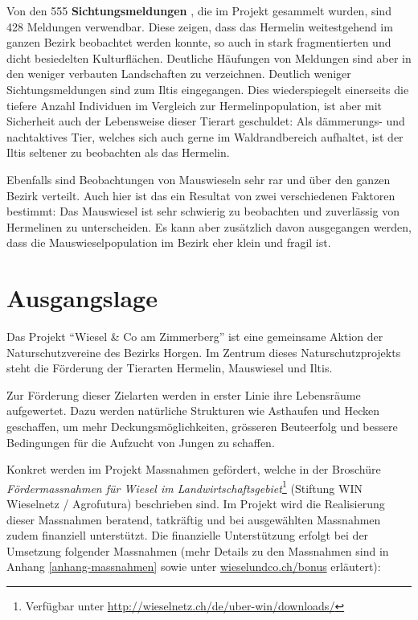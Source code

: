 \documentclass[
  oneside]{scrbook}
\begin{document}
Von den 555 \textbf{Sichtungsmeldungen} , die im Projekt gesammelt wurden, sind 428 Meldungen verwendbar. Diese zeigen, dass das Hermelin weitestgehend im ganzen Bezirk beobachtet werden konnte, so auch in stark fragmentierten und dicht besiedelten Kulturflächen. Deutliche Häufungen von Meldungen sind aber in den weniger verbauten Landschaften zu verzeichnen. Deutlich weniger Sichtungsmeldungen sind zum Iltis eingegangen. Dies wiederspiegelt einerseits die tiefere Anzahl Individuen im Vergleich zur Hermelinpopulation, ist aber mit Sicherheit auch der Lebensweise dieser Tierart geschuldet: Als dämmerungs- und nachtaktives Tier, welches sich auch gerne im Waldrandbereich aufhaltet, ist der Iltis seltener zu beobachten als das Hermelin.

Ebenfalls sind Beobachtungen von Mauswieseln sehr rar und über den ganzen Bezirk verteilt. Auch hier ist das ein Resultat von zwei verschiedenen Faktoren bestimmt: Das Mauswiesel ist sehr schwierig zu beobachten und zuverlässig von Hermelinen zu unterscheiden. Es kann aber zusätzlich davon ausgegangen werden, dass die Mauswieselpopulation im Bezirk eher klein und fragil ist.

\hypertarget{ausgangslage}{%
\chapter{Ausgangslage}\label{ausgangslage}}

Das Projekt ``Wiesel \& Co am Zimmerberg'' ist eine gemeinsame Aktion der Naturschutzvereine des Bezirks Horgen. Im Zentrum dieses Naturschutzprojekts steht die Förderung der Tierarten Hermelin, Mauswiesel und Iltis.

Zur Förderung dieser Zielarten werden in erster Linie ihre Lebensräume aufgewertet. Dazu werden natürliche Strukturen wie Asthaufen und Hecken geschaffen, um mehr Deckungsmöglichkeiten, grösseren Beuteerfolg und bessere Bedingungen für die Aufzucht von Jungen zu schaffen.

Konkret werden im Projekt Massnahmen gefördert, welche in der Broschüre \emph{Fördermassnahmen für Wiesel im Landwirtschaftsgebiet}\footnote{Verfügbar unter \url{http://wieselnetz.ch/de/uber-win/downloads/}} (Stiftung WIN Wieselnetz / Agrofutura) beschrieben sind. Im Projekt wird die Realisierung dieser Massnahmen beratend, tatkräftig und bei ausgewählten Massnahmen zudem finanziell unterstützt. Die finanzielle Unterstützung erfolgt bei der Umsetzung folgender Massnahmen (mehr Details zu den Massnahmen sind in Anhang \ref{anhang-massnahmen} sowie unter \href{http://www.wieselundco.ch/bonus}{wieselundco.ch/bonus} erläutert):
\end{document}
